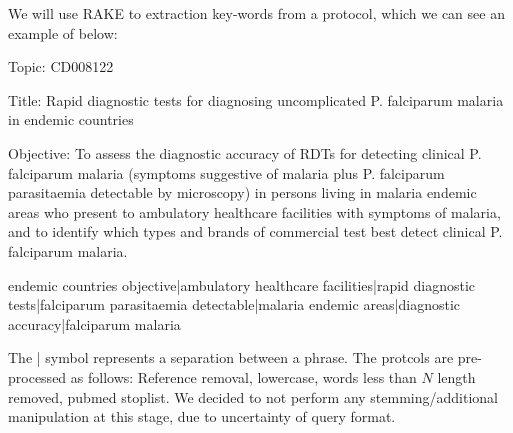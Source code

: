 We will use RAKE \cite{rake} to extraction key-words from a protocol, which we can see an example of below:

\begin{tcolorbox}

Topic: CD008122 

Title: Rapid diagnostic tests for diagnosing uncomplicated P. falciparum malaria in endemic countries 

Objective: To assess the diagnostic accuracy of RDTs for detecting clinical P. falciparum malaria (symptoms suggestive of malaria plus P. falciparum parasitaemia detectable by microscopy) in persons living in malaria endemic areas who present to ambulatory healthcare facilities with symptoms of malaria, and to identify which types and brands of commercial test best detect clinical P. falciparum malaria.

\end{tcolorbox}

 
\begin{tcolorbox}

endemic countries objective|ambulatory healthcare facilities|rapid diagnostic tests|falciparum parasitaemia detectable|malaria endemic areas|diagnostic accuracy|falciparum malaria

\end{tcolorbox}

The | symbol represents a separation between a phrase. The protcols are pre-processed as follows: Reference removal, lowercase, words less than $N$ length removed, pubmed stoplist. We decided to not perform any stemming/additional manipulation at this stage, due to uncertainty of query format.


